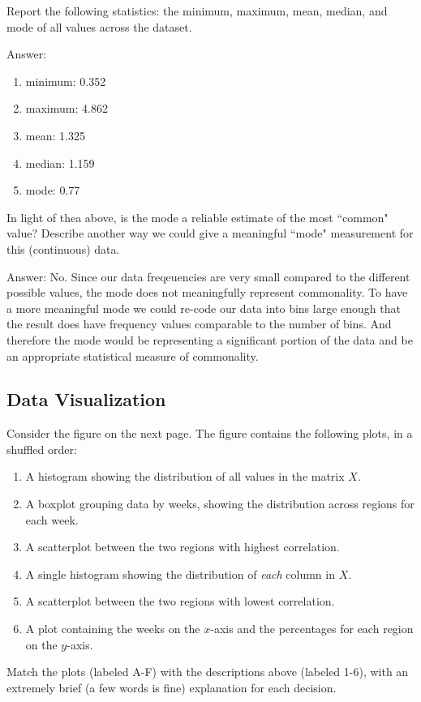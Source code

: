 \documentclass{article}
\def\ans#1{\par\gre{Answer: #1}}
\def\blu#1{{\color{blu}#1}}
\def\gre#1{{\color{gre}#1}}
\def\enum#1{\begin{enumerate}#1\end{enumerate}}
\begin{document}
\blu{Report the following statistics}: the minimum, maximum, mean, median, and mode of all values across the dataset.
\ans{
	\begin{enumerate}
		\item minimum: 0.352
		\item maximum: 4.862
		\item mean: 1.325
		\item median: 1.159
		\item mode: 0.77
	\end{enumerate}
}

In light of thea above, \blu{is the mode a reliable estimate of the most ``common" value? Describe another way we could give a meaningful ``mode" measurement for this (continuous) data.}

\ans{
	No. Since our data freqeuencies are very small compared to the different possible values, the mode does not meaningfully represent commonality. To have a more meaningful mode we could re-code our data into bins large enough that the result does have frequency values comparable to the number of bins. And therefore the mode would be representing a significant portion of the data and be an appropriate statistical measure of commonality.
}

\subsection{Data Visualization}

Consider the figure on the next page.
The figure contains the following plots, in a shuffled order:
\enum{
\item A histogram showing the distribution of all values in the matrix $X$.
\item A boxplot grouping data by weeks, showing the distribution across regions for each week.
\item A scatterplot between the two regions with highest correlation.
\item A single histogram showing the distribution of \emph{each} column in $X$.
\item A scatterplot between the two regions with lowest correlation.
\item A plot containing the weeks on the $x$-axis and the percentages for each region on the $y$-axis.
}
\blu{Match the plots (labeled A-F) with the descriptions above (labeled 1-6), with an extremely brief (a few words is fine) explanation for each decision.}
\end{document}
